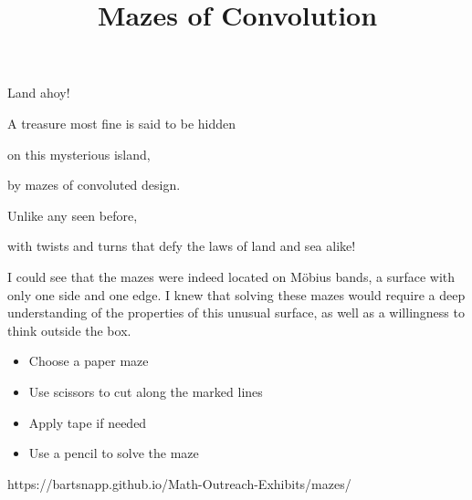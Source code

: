 \documentclass{../exhibit}
\title{Mazes of Convolution}
\begin{document}
\begin{context}

Land ahoy!

A treasure most fine is said to be hidden


on this mysterious island, 


by mazes of convoluted design.



Unlike any seen before,


with twists and turns that defy the laws of land and sea alike!

I could see that the mazes were indeed located on M\"obius bands, a surface with only one side and one edge. I knew that solving these mazes would require a deep understanding of the properties of this unusual surface, as well as a willingness to think outside the box.
\end{context}

\begin{directions}
  \begin{itemize}
    \item Choose a paper maze
\item Use scissors to cut along the marked lines 
\item Apply tape if needed
  \item Use a pencil to solve the maze
\end{itemize}
\end{directions}

\begin{example}
\end{example}

\begin{mathConnections}
  https://bartsnapp.github.io/Math-Outreach-Exhibits/mazes/
\end{mathConnections}
\end{document}

